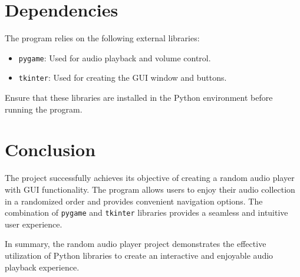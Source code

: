 \documentclass{article}
\begin{document}
\section{Dependencies}
The program relies on the following external libraries:
\begin{itemize}
  \item \texttt{pygame}: Used for audio playback and volume control.
  \item \texttt{tkinter}: Used for creating the GUI window and buttons.
\end{itemize}

Ensure that these libraries are installed in the Python environment before running the program.

\section{Conclusion}
The project successfully achieves its objective of creating a random audio player with GUI functionality. The program allows users to enjoy their audio collection in a randomized order and provides convenient navigation options. The combination of \texttt{pygame} and \texttt{tkinter} libraries provides a seamless and intuitive user experience.

In summary, the random audio player project demonstrates the effective utilization of Python libraries to create an interactive and enjoyable audio playback experience.
\end{document}
